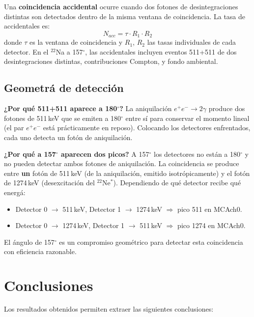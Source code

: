 \documentclass[12pt,a4paper]{article}
\begin{document}
Una \textbf{coincidencia accidental} ocurre cuando dos fotones de desintegraciones distintas
son detectados dentro de la misma ventana de coincidencia. La tasa de accidentales es:
\begin{equation}
N_{acc} = \tau \cdot R_1 \cdot R_2
\end{equation}
donde $\tau$ es la ventana de coincidencia y $R_1$, $R_2$ las tasas individuales de cada detector.
En el $^{22}$Na a 157$^\circ$, las accidentales incluyen eventos 511+511 de dos desintegraciones
distintas, contribuciones Compton, y fondo ambiental.

\subsection{Geometr\'a de detecci\'on}

\textbf{¿Por qu\'e 511+511 aparece a 180$^\circ$?}
La aniquilaci\'on $e^+e^- \to 2\gamma$ produce dos fotones de 511\,keV que se emiten a
180$^\circ$ entre s\'i para conservar el momento lineal (el par $e^+e^-$ est\'a pr\'acticamente
en reposo). Colocando los detectores enfrentados, cada uno detecta un fot\'on de aniquilaci\'on.

\textbf{¿Por qu\'e a 157$^\circ$ aparecen dos picos?}
A 157$^\circ$ los detectores no est\'an a 180$^\circ$ y no pueden detectar ambos fotones de
aniquilaci\'on. La coincidencia se produce entre \textbf{un} fot\'on de 511\,keV
(de la aniquilaci\'on, emitido isotr\'opicamente) y el fot\'on de 1274\,keV
(desexcitaci\'on del $^{22}$Ne$^*$). Dependiendo de qu\'e detector recibe qu\'e energ\'a:
\begin{itemize}
  \item Detector 0 $\to$ 511\,keV, Detector 1 $\to$ 1274\,keV $\Rightarrow$ pico 511 en MCAch0.
  \item Detector 0 $\to$ 1274\,keV, Detector 1 $\to$ 511\,keV $\Rightarrow$ pico 1274 en MCAch0.
\end{itemize}
El \'angulo de 157$^\circ$ es un compromiso geom\'etrico para detectar esta coincidencia
con eficiencia razonable.

\section{Conclusiones}

Los resultados obtenidos permiten extraer las siguientes conclusiones:
\end{document}

